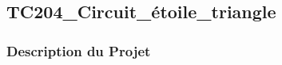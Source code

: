 \documentclass[a4paper,12pt]{report}
\begin{document}
\newpage
\subsection{TC204\_Circuit\_étoile\_triangle}
\begin{center}
\label{}
\end{center}
\subsubsection{Description du Projet}
\end{document}
